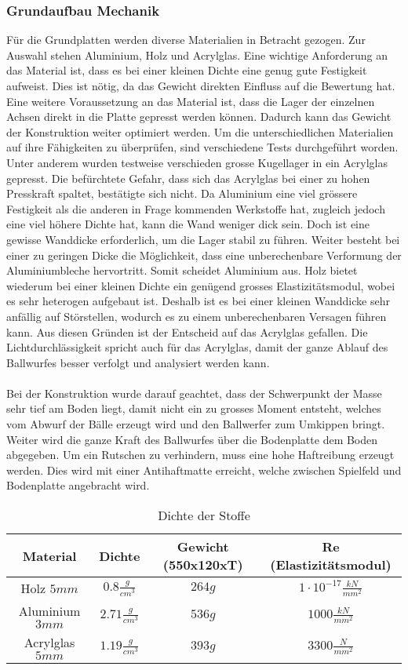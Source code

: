 \subsubsection{Grundaufbau Mechanik}
Für die Grundplatten werden diverse Materialien in Betracht gezogen. Zur Auswahl stehen Aluminium,
Holz und Acrylglas. Eine wichtige Anforderung an das Material ist, dass es bei einer kleinen Dichte
eine genug gute Festigkeit aufweist. Dies ist nötig, da das Gewicht direkten Einfluss auf die
Bewertung hat. Eine weitere Voraussetzung an das Material ist, dass die Lager der einzelnen Achsen
direkt in die Platte gepresst werden können. Dadurch kann das Gewicht der Konstruktion weiter
optimiert werden. Um die unterschiedlichen Materialien auf ihre Fähigkeiten zu überprüfen, sind
verschiedene Tests durchgeführt worden. Unter anderem wurden testweise verschieden grosse Kugellager
in ein Acrylglas gepresst. Die befürchtete Gefahr, dass sich das Acrylglas bei einer zu hohen
Presskraft spaltet, bestätigte sich nicht. Da Aluminium eine viel grössere Festigkeit als die
anderen in Frage kommenden Werkstoffe hat, zugleich jedoch eine viel höhere Dichte hat, kann die
Wand weniger dick sein. Doch ist eine gewisse Wanddicke erforderlich, um die Lager stabil zu führen.
Weiter besteht bei einer zu geringen Dicke die Möglichkeit, dass eine unberechenbare Verformung der
Aluminiumbleche hervortritt. Somit scheidet Aluminium aus. Holz bietet wiederum bei einer kleinen
Dichte ein genügend grosses Elastizitätsmodul, wobei es sehr heterogen aufgebaut ist. Deshalb ist es
bei einer kleinen Wanddicke sehr anfällig auf Störstellen, wodurch es zu einem unberechenbaren
Versagen führen kann. Aus diesen Gründen ist der Entscheid auf das Acrylglas gefallen. Die
Lichtdurchlässigkeit spricht auch für das Acrylglas, damit der ganze Ablauf des Ballwurfes besser
verfolgt und analysiert werden kann.\\
\\
Bei der Konstruktion wurde darauf geachtet, dass der Schwerpunkt der Masse sehr tief am Boden liegt,
damit nicht ein zu grosses Moment entsteht, welches vom Abwurf der Bälle erzeugt wird und den
Ballwerfer zum Umkippen bringt. Weiter wird die ganze Kraft des Ballwurfes über die Bodenplatte dem
Boden abgegeben. Um ein Rutschen zu verhindern, muss eine hohe Haftreibung erzeugt werden. Dies wird
mit einer Antihaftmatte erreicht, welche zwischen Spielfeld und Bodenplatte angebracht wird.
\begin{table}[h!]
	\begin{tabular}{cccc}
		Material & Dichte & Gewicht (550x120xT) & Re (Elastizitätsmodul) \\ 
		\hline \rule{0pt}{11pt}Holz $5 mm$ & $0.8 \frac{g}{cm^3}$ & $264 g$ & $1 \cdot 10^{-17} \frac{kN}{mm^2}$ \\ 
		\rule{0pt}{11pt}Aluminium $3 mm$ & $2.71 \frac{g}{cm^3}$ & $536 g$ & $1000 \frac{kN}{mm^2}$ \\ 
		\rule{0pt}{11pt}Acrylglas $5 mm$ & $1.19 \frac{g}{cm^3}$ & $393 g$ & $3300 \frac{N}{mm^2}$  \\ 
	\end{tabular} 
	\caption[Dichte der Stoffe]{Dichte der Stoffe \cite{beruf:Chemie}}
	\centering
\end{table}